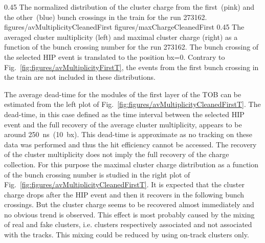                  {0.45}       %
                 {The normalized distribution of the cluster charge from the first~(pink) and the other~(blue) bunch crossings in the train for the run 273162.} 
                 {figures/avMultiplicityCleanedFirst} %
                 {figures/maxChargeCleanedFirst} %
                 {0.45}       %
                 {The averaged cluster multiplicity (left) and maximal cluster charge (right) as a function of the bunch crossing number for the run 273162. The bunch crossing of the selected HIP event is translated to the position bx=0. Contrary to Fig.~\ref{fig:figures/avMultiplicityFirstT}, the events from the first bunch crossing in the train are not included in these distributions. } %

The average dead-time for the modules of the first layer of the TOB can be estimated from the left plot of Fig.~\ref{fig:figures/avMultiplicityCleanedFirstT}. The dead-time, in this case defined as the time interval between the selected HIP event and the full recovery of the average cluster multiplicity, appears to be around 250~ns~(10~bx). This dead-time is approximate as no tracking on these data was performed and thus the hit efficiency cannot be accessed. The recovery of the cluster multiplicity does not imply the full recovery of the charge collection. For this purpose the maximal cluster charge distribution as a function of the bunch crossing number is studied in the right plot of Fig.~\ref{fig:figures/avMultiplicityCleanedFirstT}. It is expected that the cluster charge drops after the HIP event and then it recovers in the following bunch crossings. But the cluster charge seems to be recovered almost immediately and no obvious trend is observed. This effect is most probably caused by the mixing of real and fake clusters, i.e. clusters respectively associated and not associated with the tracks. This mixing could be reduced by using on-track clusters only.

